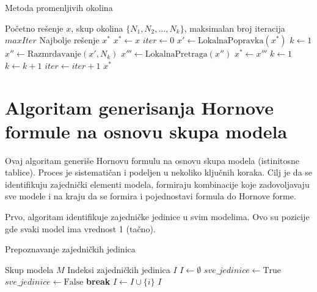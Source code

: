 \documentclass[12pt,oneside]{memoir}
\begin{document}
\begin{algorithm}[H]
\caption{Metoda promenljivih okolina}
\renewcommand{\algorithmicrequire}{\textbf{Ulaz:}}
\renewcommand{\algorithmicensure}{\textbf{Izlaz:}}
\begin{algorithmic}[1]
\REQUIRE Početno rešenje $x$, skup okolina $\{N_1, N_2, \ldots, N_k\}$, maksimalan broj iteracija $maxIter$
\ENSURE Najbolje rešenje $x^*$
\STATE $x^* \gets x$
\STATE $iter \gets 0$
    \STATE $x' \gets \text{LokalnaPopravka}(x^*)$ 
    \STATE $k \gets 1$
        \STATE $x'' \gets \text{Razmrdavanje}(x', N_k)$ 
        \STATE $x''' \gets \text{LokalnaPretraga}(x'')$ 
            \STATE $x^* \gets x'''$
            \STATE $k \gets 1$
        \ELSE
            \STATE $k \gets k + 1$
        \ENDIF
    \ENDWHILE
    \STATE $iter \gets iter + 1$
\ENDWHILE
\RETURN $x^*$
\end{algorithmic}
\end{algorithm}


\section{Algoritam generisanja Hornove formule na osnovu skupa modela}

Ovaj algoritam generiše Hornovu formulu na osnovu skupa modela (istinitosne tablice). Proces je sistematičan i podeljen u nekoliko ključnih koraka. Cilj je da se identifikuju zajednički elementi modela, formiraju kombinacije koje zadovoljavaju sve modele i na kraju da se formira i pojednostavi formula do Hornove forme.

Prvo, algoritam identifikuje zajedničke jedinice u svim modelima. Ovo su pozicije gde svaki model ima vrednost 1 (tačno).

\begin{algorithm}[H]
\caption{Prepoznavanje zajedničkih jedinica}
\renewcommand{\algorithmicrequire}{\textbf{Ulaz:}}
\renewcommand{\algorithmicensure}{\textbf{Izlaz:}}
\begin{algorithmic}[1]
\REQUIRE Skup modela $M$
\ENSURE Indeksi zajedničkih jedinica $I$
\STATE $I \gets \emptyset$
    \STATE $sve\_jedinice \gets \text{True}$
            \STATE $sve\_jedinice \gets \text{False}$
            \STATE \textbf{break}
        \ENDIF
    \ENDFOR
        \STATE $I \gets I \cup \{ i \}$
    \ENDIF
\ENDFOR
\RETURN $I$
\end{algorithmic}
\end{algorithm}
\end{document}
